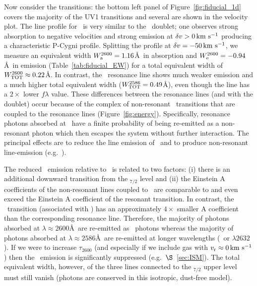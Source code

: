 \documentclass[12pt,preprint]{aastex}
\begin{document}
Now consider the  transitions:
the bottom left panel of Figure~\ref{fig:fiducial_1d} covers the
majority of the  UV1 transitions and several are
shown in the velocity plot.  The line
profile for \feiib\ is very similar to the \mgiid\ doublet;
one observes strong absorption to negative velocities and strong
emission at $\delta v > 0 \, {\rm km~s^{-1}}$ producing a characteristic P-Cygni profile. 
Splitting
the profile at $\delta v = -50 \, {\rm km~s^{-1}}$, we measure an equivalent width
$W^{2600}_{\rm a} = 1.16$\AA\ in absorption and $W^{2600}_{\rm e} =
-0.94$\AA\ in emission (Table~\ref{tab:fiducial_EW}) for a total
equivalent width of $W^{2600}_{\rm TOT} \approx 0.22$\AA.  
In contrast, the \feiia\ resonance line shows much weaker emission and
a much higher total equivalent width ($W^{2586}_{\rm TOT} = 0.49$\AA),
even though the line has a $2 \times$ lower $f\lambda$ value.
These differences between the  resonance lines (and with the
 doublet) occur because of the complex of non-resonant
\feiis\ transitions that are coupled to the resonance lines
(Figure~\ref{fig:energy}).  Specifically, 
resonance photons absorbed at \feiid\ have a finite probability of
being re-emitted as a non-resonant photon which then escapes the system
without further interaction.  The principal effects are to reduce the
line emission of \feiid\ and to produce non-resonant line-emission (e.g.\
\feiic).

The reduced \feiia\ emission relative to \feiib\ is related to
two factors:
(i) there is an additional downward transition from the
\zconfig$_{7/2}$ level and 
(ii) the Einstein A
coefficients of the non-resonant lines coupled to \feiia\ are comparable to and even
exceed the Einstein A coefficient of
the resonant transition.  In contrast, 
the \feiie\ transition (associated with \feiib)
has an approximately  $4\times$ smaller A coefficient than the
corresponding
resonance line.  Therefore, the majority of photons absorbed at
$\lambda \approx 2600$\AA\ are re-emitted as \feiib\ photons whereas 
the majority of photons absorbed at $\lambda \approx 2586$\AA\ are re-emitted 
at longer wavelengths (\feiic\ or $\lambda 2632$).
If we were to increase $\tau_{2600}$ (and especially if we include
gas with $v_{\rm r} \approx 0 \, {\rm km~s^{-1}}$) then the \feiib\ emission is
significantly suppressed (e.g.\ $\S$~\ref{sec:ISM}).
The total equivalent width, however, of the three lines connected to the
\zconfig$_{7/2}$ upper level must still vanish (photons are conserved
in this isotropic, dust-free model).
\end{document}
